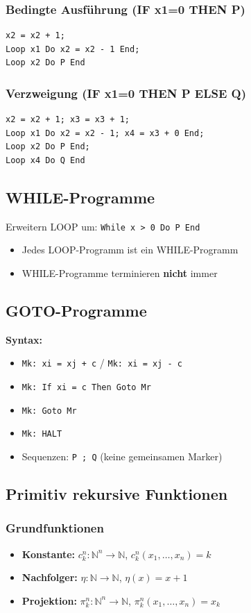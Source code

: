 \subsubsection{Bedingte Ausführung (IF x1=0 THEN P)}
\begin{verbatim}
x2 = x2 + 1;
Loop x1 Do x2 = x2 - 1 End;
Loop x2 Do P End
\end{verbatim}

\subsubsection{Verzweigung (IF x1=0 THEN P ELSE Q)}
\begin{verbatim}
x2 = x2 + 1; x3 = x3 + 1;
Loop x1 Do x2 = x2 - 1; x4 = x3 + 0 End;
Loop x2 Do P End;
Loop x4 Do Q End
\end{verbatim}

\subsection{WHILE-Programme}
Erweitern LOOP um: \texttt{While x > 0 Do P End}\\
\begin{itemize}
    \item Jedes LOOP-Programm ist ein WHILE-Programm
    \item WHILE-Programme terminieren \textbf{nicht} immer
\end{itemize}

\subsection{GOTO-Programme}
\textbf{Syntax:}
\begin{itemize}
    \item \texttt{Mk: xi = xj + c} / \texttt{Mk: xi = xj - c}
    \item \texttt{Mk: If xi = c Then Goto Mr}
    \item \texttt{Mk: Goto Mr}
    \item \texttt{Mk: HALT}
    \item Sequenzen: \texttt{P ; Q} (keine gemeinsamen Marker)
\end{itemize}

\subsection{Primitiv rekursive Funktionen}
\subsubsection{Grundfunktionen}
\begin{itemize}
    \item \textbf{Konstante:} $c_k^n : \mathbb{N}^n \to \mathbb{N}$, $c_k^n(x_1, \ldots, x_n) = k$
    \item \textbf{Nachfolger:} $\eta : \mathbb{N} \to \mathbb{N}$, $\eta(x) = x + 1$
    \item \textbf{Projektion:} $\pi_k^n : \mathbb{N}^n \to \mathbb{N}$, $\pi_k^n(x_1, \ldots, x_n) = x_k$
\end{itemize}

